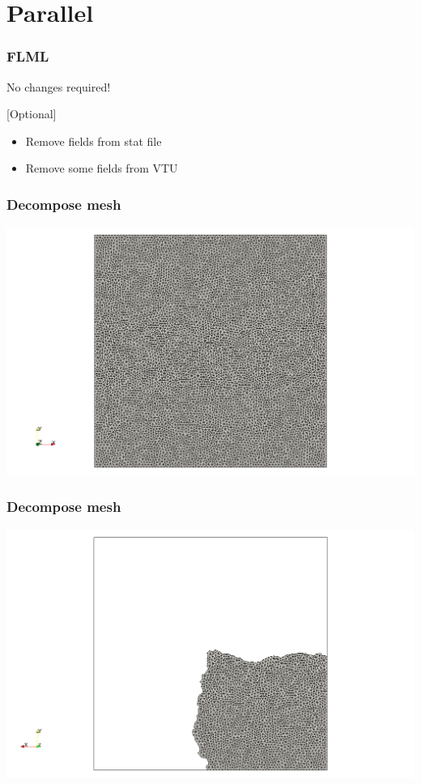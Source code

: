 \documentclass[12pt]{beamer}
\begin{document}
\section{Parallel}
\begin{frame}
    \frametitle{FLML}
No changes required!
\vspace{5mm}

[Optional]
\begin{itemize}
\item Remove fields from stat file
\item Remove some fields from VTU
\end{itemize}
\end{frame}

\begin{frame}
    \frametitle{Decompose mesh}
\vspace{-2mm}
\includegraphics[width=\textwidth]{images/fulldomain.png}
\end{frame}
\begin{frame}
    \frametitle{Decompose mesh}
\vspace{-2mm}
\includegraphics[width=\textwidth]{images/partition1.png}
\end{frame}
\end{document}
